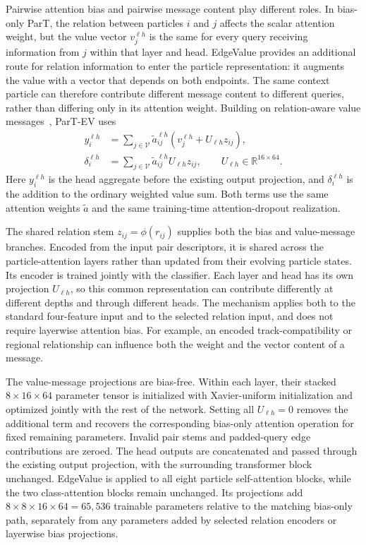 Pairwise attention bias and pairwise message content play different roles.
In bias-only ParT, the relation between particles $i$ and $j$ affects the scalar
attention weight, but the value vector $v_j^{\ell h}$ is the same for every
query receiving information from $j$ within that layer and head. EdgeValue
provides an additional route for relation information to enter the particle
representation: it augments the value with a vector that depends on both
endpoints. The same context particle can therefore contribute different message
content to different queries, rather than differing only in its attention weight.
Building on relation-aware value messages~\cite{Shaw2018Relative}, ParT-EV uses
\begin{align}
 y_i^{\ell h}
 &=\sum_{j\in\mathcal V}\widetilde a^{\ell h}_{ij}
   \left(v_j^{\ell h}+U_{\ell h}z_{ij}\right),
 \label{eq:edgevalue}\\
 \delta_i^{\ell h}
 &=\sum_{j\in\mathcal V}\widetilde a^{\ell h}_{ij}U_{\ell h}z_{ij},
 \qquad U_{\ell h}\in\mathbb R^{16\times64}.
 \label{eq:edgevalue-message}
\end{align}
Here $y_i^{\ell h}$ is the head aggregate before the existing output projection,
and $\delta_i^{\ell h}$ is the addition to the ordinary weighted value sum.
Both terms use the same attention weights $\widetilde a$ and the same
training-time attention-dropout realization.

The shared relation stem $z_{ij}=\phi(r_{ij})$ supplies both the bias and
value-message branches. Encoded from the input pair descriptors, it is shared
across the particle-attention layers rather than updated from their evolving
particle states. Its encoder is trained jointly with the classifier.
Each layer and head has its own projection $U_{\ell h}$, so this common representation can contribute
differently at different depths and through different heads. The mechanism
applies both to the standard four-feature input and to the selected relation
input, and does not require layerwise attention bias. For example, an encoded
track-compatibility or regional relationship can influence both the weight and
the vector content of a message.

The value-message projections are bias-free. Within each layer, their stacked
$8\times16\times64$ parameter tensor is initialized with Xavier-uniform
initialization and optimized jointly with the rest of the network. Setting all
$U_{\ell h}=0$ removes the additional term and recovers the corresponding
bias-only attention operation for fixed remaining parameters. Invalid pair
stems and padded-query edge contributions are zeroed. The head outputs are
concatenated and passed through the existing output projection, with the
surrounding transformer block unchanged. EdgeValue is applied to all eight
particle self-attention blocks, while the two class-attention blocks remain
unchanged. Its projections add $8\times8\times16\times64=65{,}536$ trainable
parameters relative to the matching bias-only path, separately from any
parameters added by selected relation encoders or layerwise bias projections.

